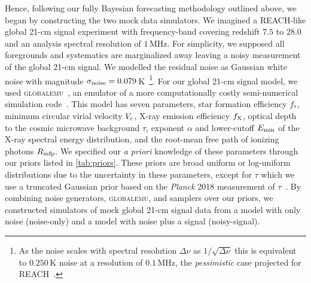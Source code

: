 \documentclass[twocolumn,english,aps,prl,amsmath,amssymb,reprint,footinbib,floatfix,showkeys]{revtex4-2}
\begin{document}
Hence, following our fully Bayesian forecasting methodology outlined above, we began by constructing the two mock data simulators. 
We imagined a REACH-like global 21-cm signal experiment with frequency-band covering redshift $7.5$ to $28.0$ and an analysis spectral resolution of $1$\,MHz.
For simplicity, we supposed all foregrounds and systematics are marginalized away leaving a noisy measurement of the global 21-cm signal.
We modelled the residual noise as Gaussian white noise with magnitude $\sigma_{\rm noise} = 0.079$\,K~\footnote{As the noise scales with spectral resolution $\Delta \nu$ as $1/\sqrt{\Delta \nu}$ this is equivalent to $0.250$\,K noise at a resolution of $0.1$\,MHz, the \textit{pessimistic} case projected for REACH~\citep{REACH}.}.
For our global 21-cm signal model, we used \textsc{globalemu}~\citep{GLOBALEMU}, an emulator of a more computationally costly semi-numerical simulation code~\citep[e.g.,][]{Visbal_2012, Fialkov_2014, Reis_2020}. 
This model has seven parameters, star formation efficiency $f_{*}$, minimum circular virial velocity $V_{\rm c}$, X-ray emission efficiency $f_{\rm X}$, optical depth to the cosmic microwave background $\tau$, exponent $\alpha$ and lower-cutoff $E_{\rm min}$ of the X-ray spectral energy distribution, and the root-mean free path of ionizing photons $R_{\rm mfp}$.
We specified our \textit{a priori} knowledge of these parameters through our priors listed in \cref{tab:priors}. 
These priors are broad uniform or log-uniform distributions due to the uncertainty in these parameters, except for $\tau$ which we use a truncated Gaussian prior based on the \textit{Planck} 2018 measurement of $\tau$~\citep{Planck_VI}.
By combining noise generators, \textsc{globalemu}, and samplers over our priors, we constructed simulators of mock global 21-cm signal data from a model with only noise (noise-only) and a model with noise plus a signal (noisy-signal).  
\end{document}
